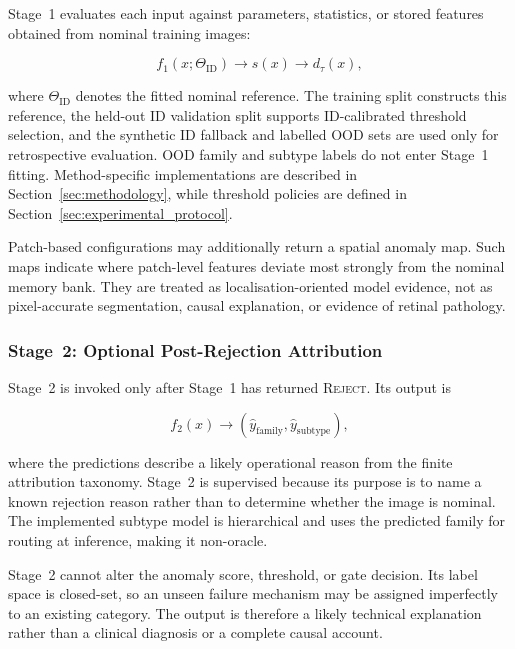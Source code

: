 \documentclass[fleqn,12pt]{olplainarticle}
\begin{document}
Stage~1 evaluates each input against parameters, statistics, or stored
features obtained from nominal training images:

\begin{equation}
    f_{1}\!\left(x;\Theta_{\mathrm{ID}}\right)
    \longrightarrow s(x)
    \longrightarrow d_{\tau}(x),
    \label{eq:stage1_system_interface}
\end{equation}

where $\Theta_{\mathrm{ID}}$ denotes the fitted nominal reference. The training
split constructs this reference, the held-out ID validation split supports
ID-calibrated threshold selection, and the synthetic ID fallback and labelled
OOD sets are used only for retrospective evaluation. OOD family and subtype
labels do not enter Stage~1 fitting. Method-specific implementations are
described in Section~\ref{sec:methodology}, while threshold policies are
defined in Section~\ref{sec:experimental_protocol}.

Patch-based configurations may additionally return a spatial anomaly map.
Such maps indicate where patch-level features deviate most strongly from the
nominal memory bank. They are treated as localisation-oriented model evidence,
not as pixel-accurate segmentation, causal explanation, or evidence of retinal
pathology.

\subsubsection{Stage~2: Optional Post-Rejection Attribution}
\label{subsubsec:stage2_design}

Stage~2 is invoked only after Stage~1 has returned \textsc{Reject}. Its output
is

\begin{equation}
    f_{2}(x)
    \longrightarrow
    \left(
        \widehat{y}_{\mathrm{family}},
        \widehat{y}_{\mathrm{subtype}}
    \right),
    \label{eq:stage2_system_interface}
\end{equation}

where the predictions describe a likely operational reason from the finite
attribution taxonomy. Stage~2 is supervised because its purpose is to name a
known rejection reason rather than to determine whether the image is nominal.
The implemented subtype model is hierarchical and uses the predicted family
for routing at inference, making it non-oracle.

Stage~2 cannot alter the anomaly score, threshold, or gate decision. Its label
space is closed-set, so an unseen failure mechanism may be assigned
imperfectly to an existing category. The output is therefore a likely
technical explanation rather than a clinical diagnosis or a complete causal
account.
\end{document}
